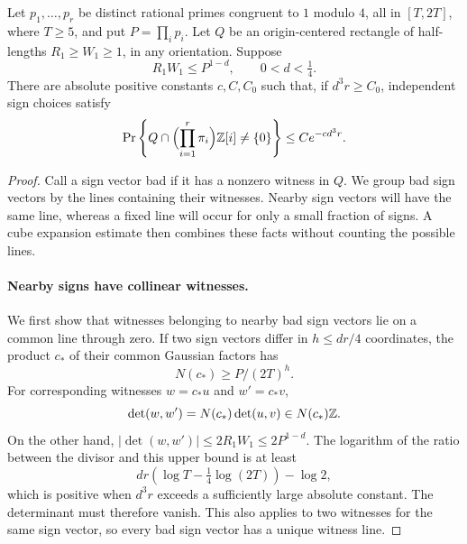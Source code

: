 \begin{lemma}
\label{lem:rectangle}
Let \(p_1,\ldots,p_r\) be distinct rational primes congruent to \(1\)
modulo \(4\), all in \([T,2T]\), where \(T\ge5\), and put \(P=\prod_i p_i\).
Let \(Q\) be an origin-centered rectangle of half-lengths
\(R_1\ge W_1\ge1\), in any orientation.
Suppose
\[
 R_1W_1\le P^{1-d},\qquad 0<d<\tfrac14.
\]
There are absolute positive constants \(c,C,C_0\) such that, if
\(d^3r\ge C_0\), independent sign choices satisfy
\[
 \Pr\left\{Q\cap\Bigl(\prod_{i=1}^r\pi_i\Bigr)\mathbb Z[i]
                      \ne\{0\}\right\}
 \le C e^{-c d^3r}.
\]
\end{lemma}

\begin{proof}
Call a sign vector bad if it has a nonzero witness in \(Q\).
We group bad sign vectors by the lines containing their witnesses.
Nearby sign vectors will have the same line, whereas a fixed line will
occur for only a small fraction of signs. A cube expansion estimate
then combines these facts without counting the possible lines.

\paragraph{Nearby signs have collinear witnesses.}
We first show that witnesses belonging to nearby bad sign vectors lie
on a common line through zero.
If two sign vectors differ in \(h\le dr/4\) coordinates, the product
\(c_*\) of their common Gaussian factors has
\[
 N(c_*)\ge P/(2T)^h.
\]
For corresponding witnesses \(w=c_*u\) and \(w'=c_*v\),
\[
 \det(w,w')=N(c_*)\det(u,v)\in N(c_*)\mathbb Z.
\]
On the other hand, \(|\det(w,w')|\le2R_1W_1\le2P^{1-d}\).
The logarithm of the ratio between the divisor and this upper bound
is at least
\[
 dr\left(\log T-\tfrac14\log(2T)\right)-\log2,
\]
which is positive when \(d^3r\) exceeds a sufficiently large absolute
constant. The determinant must therefore vanish.
This also applies to two witnesses for the same sign vector, so every
bad sign vector has a unique witness line.


\end{proof}
